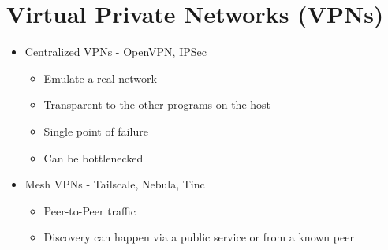 \hypertarget{virtual-private-networks-vpns}{%
\chapter{Virtual Private Networks
(VPNs)}\label{virtual-private-networks-vpns}}

\begin{itemize}
\tightlist
\item
  Centralized VPNs - OpenVPN, IPSec

  \begin{itemize}
  \tightlist
  \item
    Emulate a real network
  \item
    Transparent to the other programs on the host
  \item
    Single point of failure
  \item
    Can be bottlenecked
  \end{itemize}
\item
  Mesh VPNs - Tailscale, Nebula, Tinc

  \begin{itemize}
  \tightlist
  \item
    Peer-to-Peer traffic
  \item
    Discovery can happen via a public service or from a known peer
  \end{itemize}
\end{itemize}

